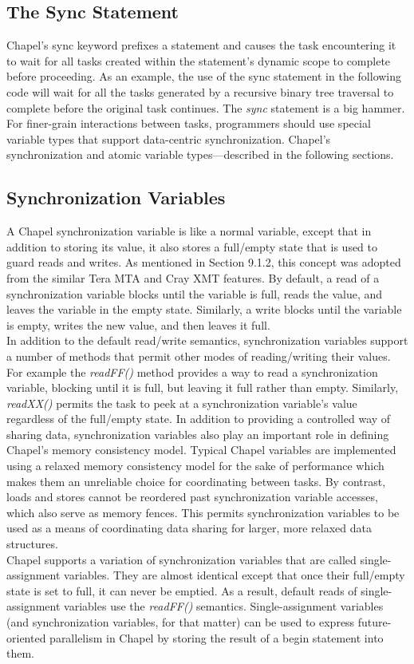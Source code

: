 \documentclass[letterpaper]{article}
\begin{document}
 \subsection{The Sync Statement}
 Chapel’s sync keyword prefixes a statement and causes the task encountering it to wait for all
 tasks created within the statement’s dynamic scope to complete before proceeding. As an example, the use of the  sync statement in the following code will wait for all the tasks generated by a recursive binary tree traversal to complete before the original task continues. The \textit{sync} statement is a big hammer. For finer-grain interactions between tasks, programmers should
 use special variable types that support data-centric synchronization. Chapel’s synchronization and atomic variable types—described in the following sections.
 
\subsection{Synchronization Variables}

A Chapel synchronization variable is like a normal variable, except that in addition to storing its value, it also stores a full/empty state that is used to guard reads and writes. As mentioned in Section 9.1.2,
this concept was adopted from the similar Tera MTA and Cray XMT features. By default, a read of a synchronization variable blocks until the variable is full, reads the value, and leaves the variable in the empty state. Similarly, a write blocks until the variable is empty, writes the new value, and then leaves it full.\\ In addition to the default read/write semantics, synchronization variables support a number of methods that permit other modes of reading/writing their values.  For example the
\textit{readFF()} method provides a way to read a synchronization variable, blocking until it is full, but leaving it full rather than empty.  Similarly, \textit{readXX()} permits the task to peek at a synchronization variable’s value regardless of the full/empty state. In addition to providing a controlled way of sharing data, synchronization variables also play an important role in defining Chapel’s memory consistency model. Typical Chapel variables are implemented using a relaxed memory consistency model for the sake of performance which makes them an unreliable choice for coordinating between tasks. By contrast, loads and stores cannot be reordered past synchronization variable accesses, which also serve as memory
fences. This permits synchronization variables to be used as a means of coordinating data sharing for larger, more relaxed data structures.\\Chapel  supports  a  variation  of  synchronization  variables  that  are  called single-assignment variables. They are almost identical except that once their full/empty state is set to full, it can never be emptied. As a result, default reads of single-assignment variables use the \textit{readFF()} semantics. Single-assignment variables (and synchronization variables, for that matter) can be used to express future-oriented parallelism in Chapel by storing the result of a begin statement into them.
\end{document}
